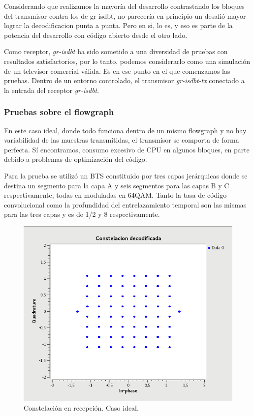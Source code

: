 Considerando que realizamos la mayoría del desarrollo contrastando los bloques del transmisor contra los de gr-isdbt, no parecería en principio un desafió mayor lograr la decodificacion punta a punta. Pero en si, lo es, y eso es parte de la potencia del desarrollo con código abierto desde el otro lado. 

Como receptor, \textit{gr-isdbt} ha sido sometido a una diversidad de pruebas con resultados satisfactorios, por lo tanto, podemos considerarlo como una simulación de un televisor comercial válida. Es en ese punto en el que comenzamos las pruebas. Dentro de un entorno controlado, el transmisor \textit{gr-isdbt-tx} conectado a la entrada del receptor \textit{gr-isdbt}.





\subsubsection{Pruebas sobre el flowgraph}

En este caso ideal, donde todo funciona dentro de un mismo flowgraph y no hay variabilidad de las muestras transmitidas, el transmisor se comporta de forma perfecta. Sí encontramos, consumo excesivo de CPU en algunos bloques, en parte debido a problemas de optimización del código.

Para la prueba se utilizó un BTS constituido por tres capas jerárquicas donde se destina un segmento para la capa A y seis segmentos para las capas B y C respectivamente, todas en moduladas en 64QAM. Tanto la tasa de código convolucional como la profundidad del entrelazamiento temporal son las mismas para las tres capas y es de 1/2 y 8 respectivamente. 

\begin{figure}[!h]
	\centering
	\includegraphics[scale=0.5]{figuras/cap06/const_rec}
	\caption{\label{f:const_rec} Constelación en recepción. Caso ideal.}
\end{figure}

